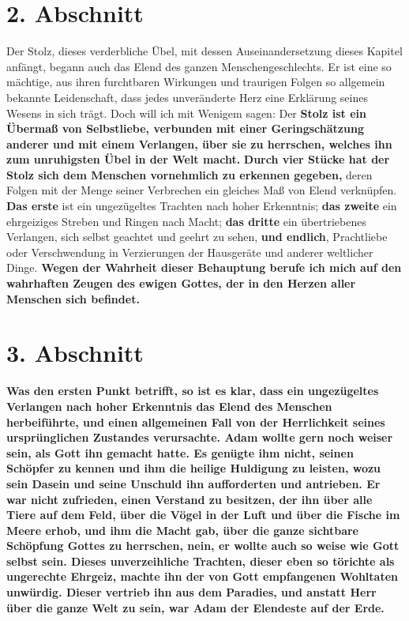 \section{2. Abschnitt} \label{kap7_ab2}

Der Stolz, dieses verderbliche Übel, mit dessen Auseinandersetzung
dieses
Kapitel anfängt, begann auch das Elend des ganzen Menschengeschlechts. Er ist
eine so mächtige, aus ihren furchtbaren Wirkungen und traurigen Folgen so
allgemein bekannte Leidenschaft, dass jedes unveränderte Herz eine Erklärung
seines Wesens in sich trägt. Doch will ich mit Wenigem sagen: Der \textbf{Stolz
ist ein Übermaß von Selbstliebe, verbunden mit einer Geringschätzung
anderer und mit einem Verlangen, über sie zu
herrschen, welches ihn zum unruhigsten Übel in der
Welt macht.} \textbf{Durch vier Stücke hat der Stolz sich dem Menschen
vornehmlich zu
erkennen gegeben,} deren Folgen mit der Menge seiner Verbrechen ein gleiches Maß
von Elend verknüpfen. \textbf{Das erste} ist ein ungezügeltes Trachten nach
hoher
Erkenntnis; \textbf{das zweite} ein ehrgeiziges Streben und
Ringen nach Macht; \textbf{das dritte} ein übertriebenes Verlangen,
sich selbst geachtet und geehrt zu sehen,
\textbf{und endlich}, Prachtliebe oder Verschwendung in
Verzierungen der Hausgeräte und anderer weltlicher Dinge. \textbf{Wegen der
Wahrheit dieser Behauptung berufe ich mich auf den wahrhaften Zeugen des ewigen
Gottes, der in den Herzen aller Menschen
sich befindet.}

\section{3. Abschnitt} \label{kap7_ab3}

\label{ref:07_03_wissen_erbsuende}
\textbf{Was den ersten Punkt betrifft, so ist es
klar, dass ein ungezügeltes Verlangen
nach hoher Erkenntnis
 das Elend des Menschen
herbeiführte, und einen allgemeinen
Fall von der Herrlichkeit seines ursprünglichen Zustandes verursachte.
 Adam
wollte gern noch weiser sein, als Gott ihn gemacht hatte. Es genügte ihm nicht,
seinen Schöpfer zu kennen und ihm die heilige Huldigung zu leisten, wozu sein
Dasein und seine Unschuld ihn aufforderten und antrieben. Er war nicht
zufrieden, einen Verstand zu besitzen, der ihn über alle
Tiere auf dem Feld,
über die Vögel in der Luft und über die Fische im Meere erhob, und ihm die Macht
gab, über die ganze sichtbare Schöpfung Gottes zu herrschen, nein, er wollte
auch so weise wie Gott selbst sein.
Dieses unverzeihliche Trachten, dieser eben so törichte als ungerechte
Ehrgeiz, machte
ihn der von Gott empfangenen Wohltaten unwürdig.
Dieser vertrieb ihn aus dem Paradies, und
anstatt Herr über die ganze Welt zu sein, war Adam der Elendeste auf der Erde.}

